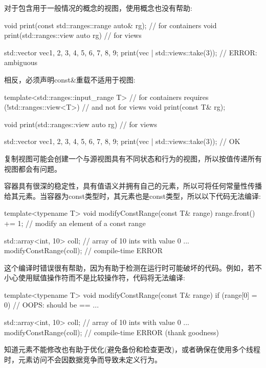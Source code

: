 对于包含用于一般情况的概念的视图，使用概念也没有帮助:

\begin{cpp}
void print(const std::ranges::range auto& rg); // for containers
void print(std::ranges::view auto rg) // for views

std::vector vec{1, 2, 3, 4, 5, 6, 7, 8, 9};
print(vec | std::views::take(3)); // ERROR: ambiguous
\end{cpp}

相反，必须声明const\&重载不适用于视图:

\begin{cpp}
template<std::ranges::input_range T> // for containers
requires (!std::ranges::view<T>) // and not for views
void print(const T& rg);

void print(std::ranges::view auto rg) // for views

std::vector vec{1, 2, 3, 4, 5, 6, 7, 8, 9};
print(vec | std::views::take(3)); // OK
\end{cpp}

复制视图可能会创建一个与源视图具有不同状态和行为的视图，所以按值传递所有视图都会有问题。


容器具有很深的稳定性，具有值语义并拥有自己的元素，所以可将任何常量性传播给其元素。当容器为const类型时，其元素也是const类型，所以以下代码无法编译:

\begin{cpp}
template<typename T>
void modifyConstRange(const T& range)
{
	range.front() += 1; // modify an element of a const range
}

std::array<int, 10> coll{}; // array of 10 ints with value 0
...
modifyConstRange(coll); // compile-time ERROR
\end{cpp}

这个编译时错误很有帮助，因为有助于检测在运行时可能破坏的代码。例如，若不小心使用赋值操作符而不是比较操作符，代码将无法编译:

\begin{cpp}
template<typename T>
void modifyConstRange(const T& range)
{
	if (range[0] = 0) { // OOPS: should be ==
		...
	}
}

std::array<int, 10> coll{}; // array of 10 ints with value 0
...
modifyConstRange(coll); // compile-time ERROR (thank goodness)
\end{cpp}

知道元素不能修改也有助于优化(避免备份和检查更改)，或者确保在使用多个线程时，元素访问不会因数据竞争而导致未定义行为。


